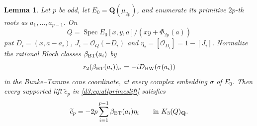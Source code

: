 \documentclass[11pt,a4paper]{amsart}
\numberwithin{equation}{section}
\newtheorem{lemma}[theorem]{Lemma}
\theoremstyle{definition}
\theoremstyle{remark}
\newcommand{\Q}{\mathbf Q}
\newcommand{\OO}{\mathcal O}
\newcommand{\Spec}{\operatorname{Spec}}
\begin{document}
\begin{lemma}\label{d3:lem:explicitoddcoefficients}
Let $p$ be odd, let $E_0=\Q(\mu_{2p})$, and enumerate its primitive
$2p$-th roots as $a_1,\ldots,a_{p-1}$. On
\[
 Q=\Spec E_0[x,y,a]/(xy+\Phi_{2p}(a))
\]
put $D_i=(x,a-a_i)$, $J_i=\OO_Q(-D_i)$ and
$\eta_i=[\OO_{D_i}]=1-[J_i]$.
Normalize the rational Bloch classes $\beta_{\rm BT}(a_i)$ by
\[
 r_2(\beta_{\rm BT}(a_i))_\sigma
   =-iD_{\rm BW}(\sigma(a_i))
\]
in the Bunke--Tamme cone coordinate, at every complex embedding
$\sigma$ of $E_0$.
Then every supported lift $\widetilde c_p$ in
\eqref{d3:eq:allprimeslift} satisfies
\begin{equation}\label{d3:eq:explicitoddcoefficient}
 \widetilde c_p=-2p\sum_{i=1}^{p-1}\beta_{\rm BT}(a_i)\eta_i
 \qquad\text{in }K_3(Q)_{\Q}.
\end{equation}
\end{lemma}
\end{document}
